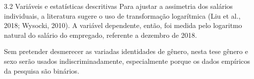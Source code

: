 3.2 Variáveis e estatísticas descritivas
Para ajustar a assimetria dos salários individuais, a literatura sugere o uso de
transformação logarítmica (Liu et al., 2018; Wysocki, 2010). A variável dependente, então, foi
medida pelo logaritmo natural do salário do empregado, referente a dezembro de 2018. 

Sem pretender desmerecer as variadas identidades de gênero, nesta tese gênero e sexo serão usados indiscriminadamente, especialmente porque os dados empíricos da pesquisa são binários. 
